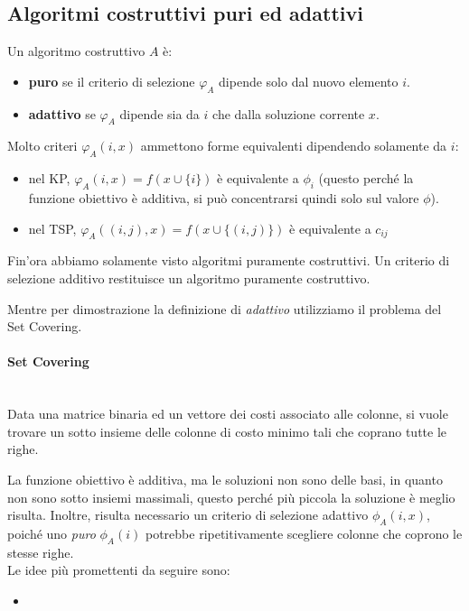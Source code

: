 \documentclass{article}
\begin{document}
    \subsection{Algoritmi costruttivi puri ed adattivi}
    Un algoritmo costruttivo $A$ è:
    \begin{itemize}
        \item \textbf{puro} se il criterio di selezione $\varphi_A$ dipende solo dal nuovo elemento $i$.
        \item \textbf{adattivo} se $\varphi_A$ dipende sia da $i$ che dalla soluzione corrente $x$.
    \end{itemize}
    Molto criteri $\varphi_A (i,x)$ ammettono forme equivalenti dipendendo solamente da $i$:
    \begin{itemize}
        \item nel KP, $\varphi_A(i,x) = f(x\cup\{i\})$ è equivalente a $\phi_i$ (questo perché la funzione obiettivo
              è additiva, si può concentrarsi quindi solo sul valore $\phi$).
        \item nel TSP, $\varphi_A((i,j),x)=f(x\cup\{(i,j)\})$ è equivalente a $c_{ij}$
    \end{itemize}
    Fin'ora abbiamo solamente visto algoritmi puramente costruttivi. Un criterio di selezione additivo
    restituisce un algoritmo puramente costruttivo.

    Mentre per dimostrazione la definizione di \textit{adattivo} utilizziamo il problema del Set Covering.

    \paragraph{Set Covering}\mbox{}\\
    Data una matrice binaria ed un vettore dei costi associato alle colonne, si vuole trovare un sotto insieme
    delle colonne di costo minimo tali che coprano tutte le righe.

    La funzione obiettivo è additiva, ma le soluzioni non sono delle basi, in quanto non sono sotto insiemi massimali,
    questo perché più piccola la soluzione è meglio risulta. Inoltre, risulta necessario un criterio di selezione
    adattivo $\phi_A(i,x)$, poiché uno \textit{puro} $\phi_A(i)$ potrebbe ripetitivamente scegliere colonne che
coprono le stesse righe.\\Le idee più promettenti da seguire sono:
\begin{itemize}
    \item
\end{itemize}
\end{document}
